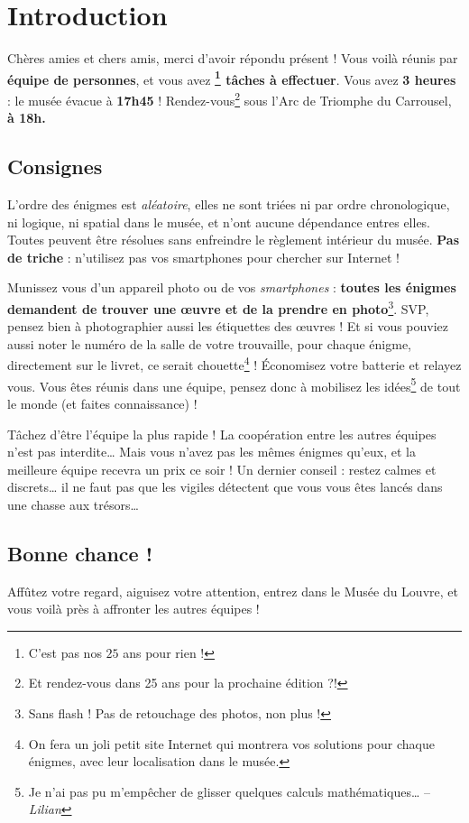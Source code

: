 \chapter{Introduction}

\vspace*{-30pt}

Chères amies et chers amis, merci d'avoir répondu présent !
%
Vous voilà réunis par \textbf{équipe de \intervalparequipe{} personnes},
et vous avez \textbf{\nbenigmes{}\footnote{C'est pas nos $25$ ans pour rien !} tâches à effectuer}.
%
Vous avez \textbf{3 heures} : le musée évacue à \textbf{17h45} !
%
Rendez-vous\footnote{Et rendez-vous dans 25 ans pour la prochaine édition ?!} sous l'Arc de Triomphe du Carrousel, \textbf{à 18h.}


\section*{Consignes}

L'ordre des énigmes est \emph{aléatoire}, elles ne sont triées ni par ordre chronologique, ni logique, ni spatial dans le musée, et n'ont aucune dépendance entres elles.
%
Toutes peuvent être résolues sans enfreindre le règlement intérieur du musée.
\textbf{Pas de triche} : n'utilisez pas vos smartphones pour chercher sur Internet !

Munissez vous d'un appareil photo ou de vos \emph{smartphones} : \textbf{toutes les énigmes demandent de trouver une œuvre et de la prendre en photo}\footnote{Sans flash ! Pas de retouchage des photos, non plus !}. SVP, pensez bien à photographier aussi les étiquettes des œuvres !
Et si vous pouviez aussi noter le numéro de la salle de votre trouvaille, pour chaque énigme, directement sur le livret, ce serait chouette\footnote{On fera un joli petit site Internet qui montrera vos solutions pour chaque énigmes, avec leur localisation dans le musée.} !
Économisez votre batterie et relayez vous.
%
Vous êtes réunis dans une équipe, pensez donc à mobilisez les idées\footnote{Je n'ai pas pu m'empêcher de glisser quelques calculs mathématiques… -- \emph{Lilian}} de tout le monde (et faites connaissance) !

Tâchez d'être l'équipe la plus rapide ! La coopération entre les autres équipes n'est pas interdite…
Mais vous n'avez pas les mêmes énigmes qu'eux, et la meilleure équipe recevra un prix ce soir !
%
Un dernier conseil : restez calmes et discrets… il ne faut pas que les vigiles détectent que vous vous êtes lancés dans une chasse aux trésors…


\section*{Bonne chance !}
Affûtez votre regard, aiguisez votre attention, entrez dans le Musée du Louvre, et vous voilà près à affronter les autres équipes !
